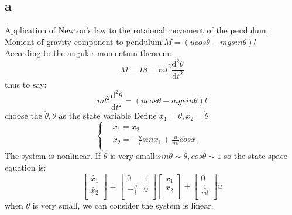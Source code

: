 \documentclass{article}
\begin{document}
\subsection*{a}
Application of Newton's law to the rotaional movement of the pendulum:\\
Moment of gravity component to pendulum:$M=(ucos\theta-mgsin\theta)l$\\
According to the angular momentum theorem:\\
\[M=I\beta=ml^2\frac{\mathrm{d}^2 \theta}{\mathrm{d}t^2}\]
thus to say:
\[ml^2\frac{\mathrm{d}^2 \theta}{\mathrm{d}t^2}=(ucos\theta-mgsin\theta)l\]
choose the $\dot{\theta},\theta$ as the state variable
Define $x_1=\theta,x_2=\dot{\theta}$
\[\left\{
\begin{aligned}
&\dot{x_1}=x_2&\\
&\dot{x_2}=-\frac{g}{l}sinx_1+\frac{u}{ml}cosx_1&\\
\end{aligned}
\right.\]
The system is nonlinear.
If $\theta$ is very small:$sin\theta \sim \theta,cos\theta \sim 1$
so the state-space equation is:
\begin{equation*}       %
\left[                %
\begin{array}{c}   %
\dot{x_1} \\  %
\dot{x_2} \\  %
\end{array}
\right]=      %
\left[                %
\begin{array}{cc}   %
0 & 1 \\  %
-\frac{g}{l} & 0 \\  %
\end{array}
\right]
\left[                %
\begin{array}{c}   %
x_1 \\  %
x_2 \\  %
\end{array}
\right]+
\left[                %
\begin{array}{c}   %
0 \\  %
\frac{1}{ml}\\  %
\end{array}
\right]u                
\end{equation*}
when $\theta$ is very small, we can consider the system is linear.
\end{document}
